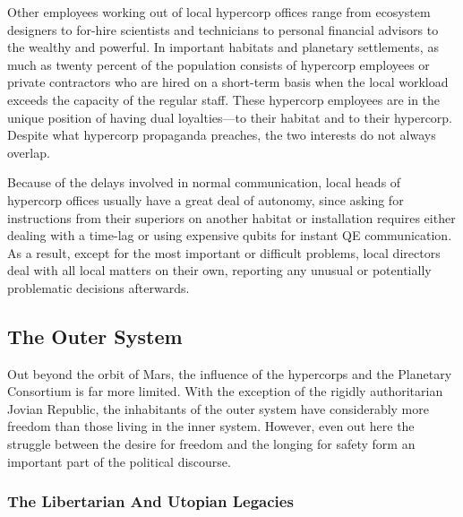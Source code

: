 Other employees working out of local hypercorp 
offices range from ecosystem designers to for-hire scientists and technicians to personal financial advisors 
to the wealthy and powerful. In important habitats 
and planetary settlements, as much as twenty percent 
of the population consists of hypercorp employees 
or private contractors who are hired on a short-term 
basis when the local workload exceeds the capacity 
of the regular staff. These hypercorp employees are 
in the unique position of having dual loyalties—to 
their habitat and to their hypercorp. Despite what 
hypercorp propaganda preaches, the two interests do 
not always overlap.

Because of the delays involved in normal communication, local heads of hypercorp offices usually 
have a great deal of autonomy, since asking for instructions from their superiors on another habitat or 
installation requires either dealing with a time-lag or 
using expensive qubits for instant QE communication. As a result, except for the most important or 
difficult problems, local directors deal with all local 
matters on their own, reporting any unusual or potentially problematic decisions afterwards.

\subsection{The Outer System}

Out beyond the orbit of Mars, the influence of the 
hypercorps and the Planetary Consortium is far more 
limited. With the exception of the rigidly authoritarian 
Jovian Republic, the inhabitants of the outer system 
have considerably more freedom than those living in 
the inner system. However, even out here the struggle 
between the desire for freedom and the longing for 
safety form an important part of the political discourse.

\subsubsection{The Libertarian And Utopian Legacies}

